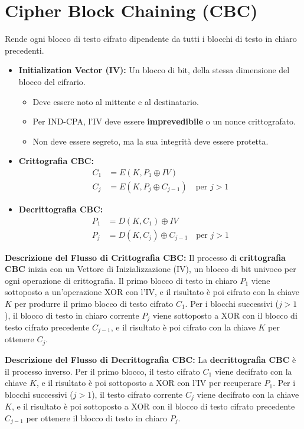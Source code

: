 \section{Cipher Block Chaining (CBC)}
Rende ogni blocco di testo cifrato dipendente da tutti i blocchi di testo in chiaro precedenti.
\begin{itemize}
    \item \textbf{Initialization Vector (IV):} Un blocco di bit, della stessa dimensione del blocco del cifrario.
    \begin{itemize}
        \item Deve essere noto al mittente e al destinatario.
        \item Per IND-CPA, l'IV deve essere \textbf{imprevedibile} o un nonce crittografato.
        \item Non deve essere segreto, ma la sua integrità deve essere protetta.
    \end{itemize}
    \item \textbf{Crittografia CBC:}
    \begin{align*}
        C_1 &= E(K, P_1 \oplus IV) \\
        C_j &= E(K, P_j \oplus C_{j-1}) \quad \text{per } j > 1
    \end{align*}
    \item \textbf{Decrittografia CBC:}
    \begin{align*}
        P_1 &= D(K, C_1) \oplus IV \\
        P_j &= D(K, C_j) \oplus C_{j-1} \quad \text{per } j > 1
    \end{align*}
\end{itemize}
\textbf{Descrizione del Flusso di Crittografia CBC:}
Il processo di \textbf{crittografia CBC} inizia con un Vettore di Inizializzazione (IV), un blocco di bit univoco per ogni operazione di crittografia. Il primo blocco di testo in chiaro $P_1$ viene sottoposto a un'operazione XOR con l'IV, e il risultato è poi cifrato con la chiave $K$ per produrre il primo blocco di testo cifrato $C_1$. Per i blocchi successivi ($j > 1$), il blocco di testo in chiaro corrente $P_j$ viene sottoposto a XOR con il blocco di testo cifrato precedente $C_{j-1}$, e il risultato è poi cifrato con la chiave $K$ per ottenere $C_j$.

\textbf{Descrizione del Flusso di Decrittografia CBC:}
La \textbf{decrittografia CBC} è il processo inverso. Per il primo blocco, il testo cifrato $C_1$ viene decifrato con la chiave $K$, e il risultato è poi sottoposto a XOR con l'IV per recuperare $P_1$. Per i blocchi successivi ($j > 1$), il testo cifrato corrente $C_j$ viene decifrato con la chiave $K$, e il risultato è poi sottoposto a XOR con il blocco di testo cifrato precedente $C_{j-1}$ per ottenere il blocco di testo in chiaro $P_j$.
